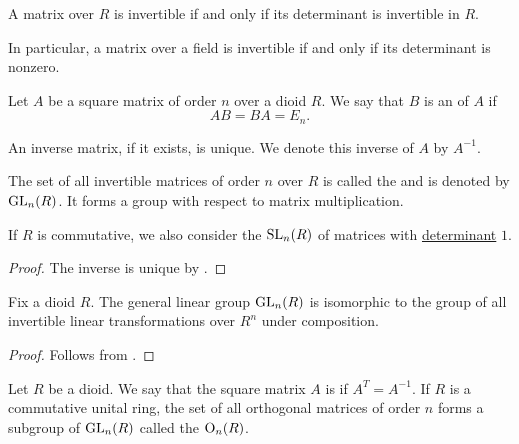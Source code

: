 \begin{proposition}\label{thm:matrix_invertible_iff_nonsingular}
  A matrix over \( R \) is invertible if and only if its determinant is invertible in \( R \).

  In particular, a matrix over a field is invertible if and only if its determinant is nonzero.
\end{proposition}

\begin{definition}\label{def:inverse_matrix}
  Let \( A \) be a square matrix of order \( n \) over a dioid \( R \). We say that \( B \) is an  of \( A \) if
  \begin{equation*}
    AB = BA = E_n.
  \end{equation*}

  An inverse matrix, if it exists, is unique. We denote this inverse of \( A \) by \( A^{-1} \).

  The set of all invertible matrices of order \( n \) over \( R \) is called the  and is denoted by \( \operatorname{GL}_n(R) \). It forms a group with respect to matrix multiplication.

  If \( R \) is commutative, we also consider the  \( \operatorname{SL}_n(R) \) of matrices with \hyperref[def:matrix_determinant]{determinant} \( 1 \).
\end{definition}
\begin{proof}
  The inverse is unique by .
\end{proof}

\begin{proposition}\label{thm:general_linear_group_isomorphic_to_automorphism_group}
  Fix a dioid \( R \). The general linear group \( \operatorname{GL}_n(R) \) is isomorphic to the group of all invertible linear transformations over \( R^n \) under composition.
\end{proposition}
\begin{proof}
  Follows from .
\end{proof}

\begin{definition}\label{def:orthogonal_matrix}
  Let \( R \) be a dioid. We say that the square matrix \( A \) is  if \( A^T = A^{-1} \). If \( R \) is a commutative unital ring, the set of all orthogonal matrices of order \( n \) forms a subgroup of \( \operatorname{GL}_n(R) \) called the  \( \operatorname{O}_n(R) \).
\end{definition}

